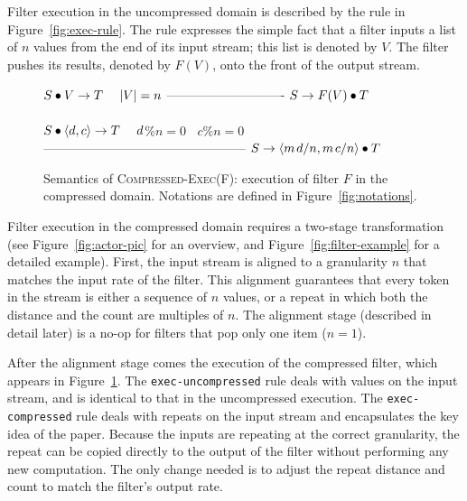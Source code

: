 Filter execution in the uncompressed domain is described by the rule
in Figure~\ref{fig:exec-rule}.  The rule expresses the simple fact
that a filter inputs a list of $n$ values from the end of its input
stream; this list is denoted by $V$.  The filter pushes its results,
denoted by $F(V)$, onto the front of the output stream.

\begin{figure*}[t]
\vspace{-6pt}
\vspace{6pt}
\caption{Example execution of a filter in the uncompressed and
  compressed domains.\protect\label{fig:filter-example}}
\end{figure*}

\begin{figure}[t]
$S \bullet V \rightarrow T~~~~|V|=n$ \skiptopb
---------------------------- \skipbot
$S \rightarrow F(V) \bullet T$
~ \\ ~ \\
$S \bullet \langle d, c\rangle \rightarrow T~~~~d$\%$n=0~~~~c$\%$n=0$ \skiptopb
------------------------------------------------ \skipbot
$S \rightarrow \langle m{\hspace{1.3pt}}d/n, m{\hspace{1.3pt}}c/n\rangle \bullet T$
\caption{Semantics of \textsc{Compressed-Exec(F)}: execution of filter
$F$ in the compressed domain.
Notations are defined in Figure~\ref{fig:notations}.
\protect\label{fig:compressed-exec-rule}}
\end{figure}

Filter execution in the compressed domain requires a two-stage
transformation (see Figure~\ref{fig:actor-pic} for an overview, and
Figure~\ref{fig:filter-example} for a detailed example).  First, the
input stream is aligned to a granularity $n$ that matches the input
rate of the filter.  This alignment guarantees that every token in the
stream is either a sequence of $n$ values, or a repeat in which both
the distance and the count are multiples of $n$.  The alignment stage
(described in detail later) is a no-op for filters that pop only one
item ($n=1$).

After the alignment stage comes the execution of the compressed
filter, which appears in Figure~\ref{fig:compressed-exec-rule}.  The
{\tt exec-uncompressed} rule
deals with values on the input stream, and is identical to that in the
uncompressed execution.  The {\tt exec-compressed} rule deals with
repeats on the input stream and encapsulates the key idea of the
paper.  Because the inputs are repeating at the correct granularity,
the repeat can be copied directly to the output of the filter without
performing any new computation.  The only change needed is to adjust
the repeat distance and count to match the filter's output rate.


